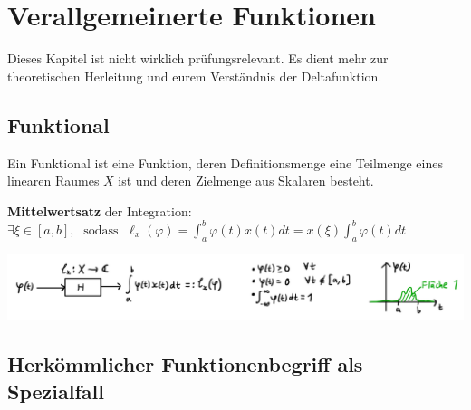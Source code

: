 \documentclass[11pt]{article}
\begin{document}
\vfill \null
\pagebreak

\section*{Verallgemeinerte Funktionen}
\vspace*{-0.5cm}
Dieses Kapitel ist nicht wirklich prüfungsrelevant. Es dient mehr zur theoretischen Herleitung und eurem Verständnis der Deltafunktion.
\vspace*{-0.5cm}
\subsection*{Funktional}
\vspace*{-0.5cm}
Ein Funktional ist eine Funktion, deren Definitionsmenge eine Teilmenge eines linearen Raumes $X$ ist und deren Zielmenge aus Skalaren besteht.

\textbf{Mittelwertsatz} der Integration: $\exists \xi \in [a,b], \; \text{  sodass  } \; \ell_x(\varphi) = \displaystyle\int_a^b \varphi(t)x(t)dt = x(\xi)\displaystyle\int_a^b \varphi(t)dt$
\vspace*{-0.5cm}
\begin{center}
    \includegraphics[width=\linewidth]{docimgs/Funktionale_1.jpg}
\end{center}

\vspace*{-0.5cm}
\subsection*{Herkömmlicher Funktionenbegriff als Spezialfall}
\vspace*{-0.5cm}
\end{document}
